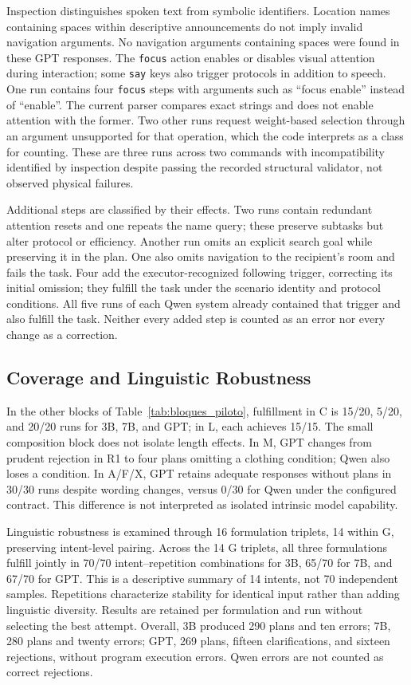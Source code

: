 \documentclass[a4paper,twoside]{article}
\begin{document}
Inspection distinguishes spoken text from symbolic identifiers. Location names containing spaces within descriptive announcements do not imply invalid navigation arguments. No navigation arguments containing spaces were found in these GPT responses. The \texttt{focus} action enables or disables visual attention during interaction; some \texttt{say} keys also trigger protocols in addition to speech. One run contains four \texttt{focus} steps with arguments such as ``focus enable'' instead of ``enable''. The current parser compares exact strings and does not enable attention with the former. Two other runs request weight-based selection through an argument unsupported for that operation, which the code interprets as a class for counting. These are three runs across two commands with incompatibility identified by inspection despite passing the recorded structural validator, not observed physical failures.

Additional steps are classified by their effects. Two runs contain redundant attention resets and one repeats the name query; these preserve subtasks but alter protocol or efficiency. Another run omits an explicit search goal while preserving it in the plan. One also omits navigation to the recipient's room and fails the task. Four add the executor-recognized following trigger, correcting its initial omission; they fulfill the task under the scenario identity and protocol conditions. All five runs of each Qwen system already contained that trigger and also fulfill the task. Neither every added step is counted as an error nor every change as a correction.

\subsection{Coverage and Linguistic Robustness}
In the other blocks of Table~\ref{tab:bloques_piloto}, fulfillment in C is 15/20, 5/20, and 20/20 runs for 3B, 7B, and GPT; in L, each achieves 15/15. The small composition block does not isolate length effects. In M, GPT changes from prudent rejection in R1 to four plans omitting a clothing condition; Qwen also loses a condition. In A/F/X, GPT retains adequate responses without plans in 30/30 runs despite wording changes, versus 0/30 for Qwen under the configured contract. This difference is not interpreted as isolated intrinsic model capability.

Linguistic robustness is examined through 16 formulation triplets, 14 within G, preserving intent-level pairing. Across the 14 G triplets, all three formulations fulfill jointly in 70/70 intent--repetition combinations for 3B, 65/70 for 7B, and 67/70 for GPT. This is a descriptive summary of 14 intents, not 70 independent samples. Repetitions characterize stability for identical input rather than adding linguistic diversity. Results are retained per formulation and run without selecting the best attempt. Overall, 3B produced 290 plans and ten errors; 7B, 280 plans and twenty errors; GPT, 269 plans, fifteen clarifications, and sixteen rejections, without program execution errors. Qwen errors are not counted as correct rejections.
\end{document}
